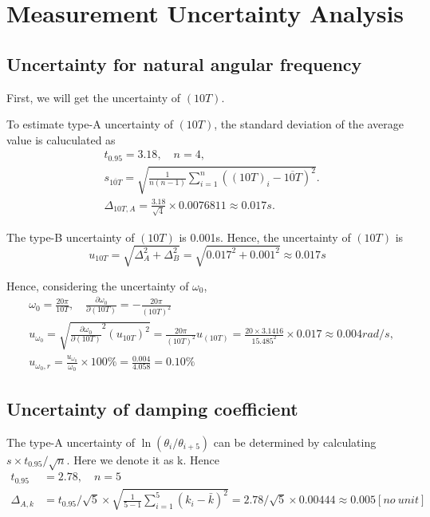 \section{Measurement Uncertainty Analysis}

\subsection{Uncertainty for natural angular frequency}
    First, we will get the uncertainty of $(10T)$.

    To estimate type-A uncertainty of $(10T)$, the standard deviation of the average value is caluculated as
    \[
    \begin{split}
        &t_{0.95}=3.18,\quad n=4,\\
        &s_{\overline{10T}}=\sqrt{\frac{1}{n(n-1)}\sum_{i=1}^n((10T)_i-\overline{10T})^2}.\\
        &\Delta_{10T,A}=\frac{3.18}{\sqrt{4}}\times0.0076811\approx 0.017s.
    \end{split}
    \]

    The type-B uncertainty of $(10T)$ is 0.001s. Hence, the uncertainty of $(10T)$ is
    \[
        u_{10T}=\sqrt{\Delta_A^2+\Delta_B^2}=\sqrt{0.017^2+0.001^2}\approx 0.017s
    \]

    Hence, considering the uncertainty of $\omega_0$,
    \[
    \begin{split}
        &\omega_0=\frac{20\pi}{10T},\quad \frac{\partial \omega_0}{\partial (10T)}=-\frac{20\pi}{(10T)^2}\\
        &u_{\omega_0}=\sqrt{\frac{\partial \omega_0}{\partial (10T)}^2(u_{10T})^2}=\frac{20\pi}{(10T)^2}u_{(10T)}=\frac{20\times3.1416}{15.485^2}\times0.017\approx0.004rad/s,\\
        &u_{\omega_0,r}=\frac{u_{\omega_0}}{\omega_0}\times100\%=\frac{0.004}{4.058}=0.10\%
    \end{split}
    \]

\subsection{Uncertainty of damping coefficient}
    The type-A uncertainty of $\ln(\theta_i/\theta_{i+5})$ can be determined by calculating $s\times t_{0.95}/\sqrt{n}$. Here we denote it as k. Hence
    \[
    \begin{split}
        t_{0.95}&=2.78,\quad n=5\\
        \Delta_{A,k}&=t_{0.95}/\sqrt{5}\times \sqrt{\frac{1}{5-1}\sum_{i=1}^5(k_i-\bar{k})^2}=2.78/\sqrt{5}\times 0.00444\approx0.005[no\ unit]
    \end{split}
    \]

